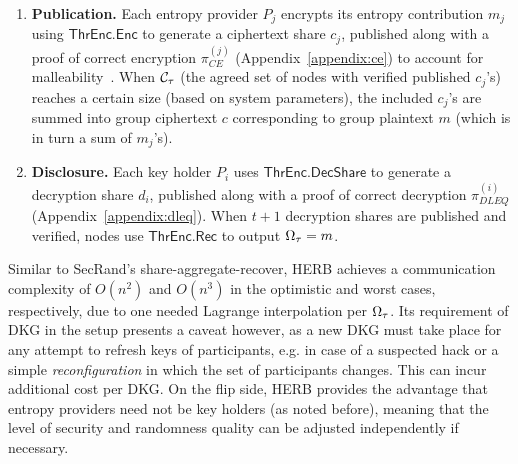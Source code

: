 \begin{enumerate}
    \item \textbf{Publication.} Each entropy provider $P_j$ encrypts its entropy contribution $m_j$ using $\mathsf{ThrEnc.Enc}$ to generate a ciphertext share $c_j$, published along with a proof of correct encryption $\pi_{CE}^{(j)}$ (Appendix~\ref{appendix:ce}) to account for malleability~\cite{dolev2003nonmalleable}. When $\mathcal{C}_\tau$ (the agreed set of nodes with verified published $c_j$'s) reaches a certain size (based on system parameters), the included $c_j$'s are summed into group ciphertext $c$ corresponding to group plaintext $m$ (which is in turn a sum of $m_j$'s).
    \item \textbf{Disclosure.} Each key holder $P_i$ uses $\mathsf{ThrEnc.DecShare}$ to generate a decryption share $d_i$, published along with a proof of correct decryption $\pi_{DLEQ}^{(i)}$ (Appendix~\ref{appendix:dleq}). When $t + 1$ decryption shares are published and verified, nodes use $\mathsf{ThrEnc.Rec}$ to output $\Omega_\tau = m$.
\end{enumerate}

Similar to SecRand's share-aggregate-recover, HERB achieves a communication complexity of $O(n^2)$ and $O(n^3)$ in the optimistic and worst cases, respectively, due to one needed Lagrange interpolation per $\Omega_\tau$. Its requirement of DKG in the setup presents a caveat however, as a new DKG must take place for any attempt to refresh keys of participants, e.g. in case of a suspected hack or a simple \textit{reconfiguration} in which the set of participants changes. This can incur additional cost per DKG. On the flip side, HERB provides the advantage that entropy providers need not be key holders (as noted before), meaning that the level of security and randomness quality can be adjusted independently if necessary.
